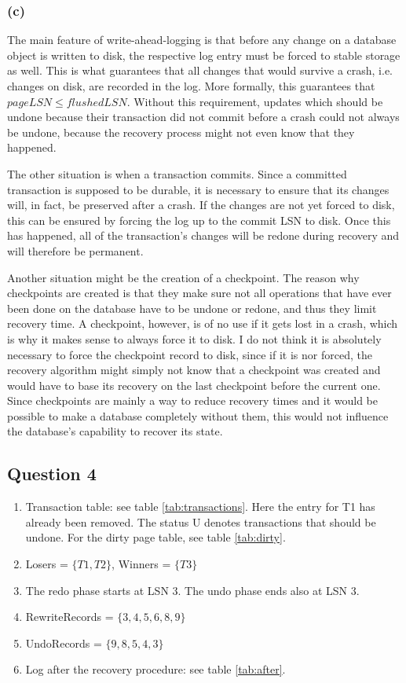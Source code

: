 \documentclass[12pt,a4paper]{article}
\begin{document}
\subsubsection*{(c)}
The main feature of write-ahead-logging is that before any change on a database object is written to disk, the respective log entry must be forced to stable storage as well. This is what guarantees that all changes that would survive a crash, i.e. changes on disk, are recorded in the log. More formally, this guarantees that $pageLSN \leq flushedLSN$. Without this requirement, updates which should be undone because their transaction did not commit before a crash could not always be undone, because the recovery process might not even know that they happened.

The other situation is when a transaction commits. Since a committed transaction is supposed to be durable, it is necessary to ensure that its changes will, in fact, be preserved after a crash. If the changes are not yet forced to disk, this can be ensured by forcing the log up to the commit LSN to disk. Once this has happened, all of the transaction's changes will be redone during recovery and will therefore be permanent.

Another situation might be the creation of a checkpoint. The reason why checkpoints are created is that they make sure not all operations that have ever been done on the database have to be undone or redone, and thus they limit recovery time. A checkpoint, however, is of no use if it gets lost in a crash, which is why it makes sense to always force it to disk. I do not think it is absolutely necessary to force the checkpoint record to disk, since if it is nor forced, the recovery algorithm might simply not know that a checkpoint was created and would have to base its recovery on the last checkpoint before the current one. Since checkpoints are mainly a way to reduce recovery times and it would be possible to make a database completely without them, this would not influence the database's capability to recover its state.


\subsection*{Question 4}
\label{sec:eq4}

\begin{enumerate}
  \item Transaction table: see table \ref{tab:transactions}. Here the entry for T1 has already been removed. The status U denotes transactions that should be undone. For the dirty page table, see table \ref{tab:dirty}.
  \item Losers = $\{T1, T2\}$, Winners = $\{T3\}$
  \item The redo phase starts at LSN 3. The undo phase ends also at LSN 3. 
  \item RewriteRecords = $\{3,4,5,6,8,9\}$
  \item UndoRecords = $\{9,8,5,4,3\}$
  \item Log after the recovery procedure: see table \ref{tab:after}.
\end{enumerate}
\end{document}
